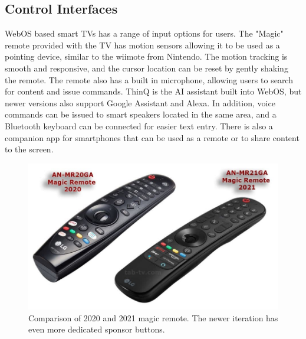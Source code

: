 \documentclass[12pt, letterpaper]{article}
\begin{document}
\subsection{Control Interfaces}
WebOS based smart TVs has a range of input options for users.  The "Magic" remote provided with the TV has motion sensors allowing it to be used as a pointing device, similar to the wiimote from Nintendo.  The motion tracking is smooth and responsive, and the cursor location can be reset by gently shaking the remote.  The remote also 
has a built in microphone, allowing users to search for content and issue commands.  ThinQ is the AI assistant built into WebOS, but newer versions also support Google Assistant and Alexa.  In addition, voice commands can be issued to smart speakers located in the same area, and a Bluetooth keyboard can be connected for easier text entry.  There is also a 
companion app for smartphones that can be used as a remote or to share content to the screen. 
\begin{figure}[h]
    \includegraphics[width=\textwidth]{photo_2021-02-21_01-30-17.jpg}
    \caption{Comparison of 2020 and 2021 magic remote. The newer iteration has even more dedicated sponsor buttons.}
\end{figure}
\end{document}
